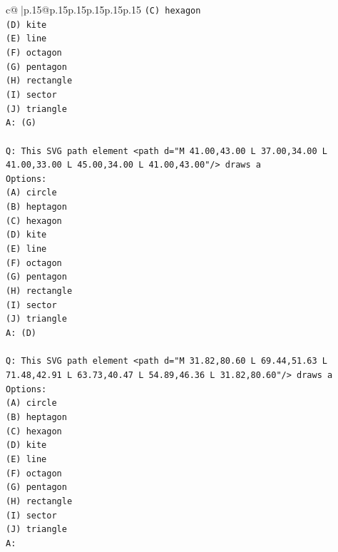 \documentclass{article}
\begin{document}
{\begin{supertabular}{c@{$\;$}|p{.15\linewidth}@{}p{.15\linewidth}p{.15\linewidth}p{.15\linewidth}p{.15\linewidth}p{.15\linewidth}}
{{{\texttt{(C) hexagon} \\
\texttt{(D) kite} \\
\texttt{(E) line} \\
\texttt{(F) octagon} \\
\texttt{(G) pentagon} \\
\texttt{(H) rectangle} \\
\texttt{(I) sector} \\
\texttt{(J) triangle} \\
\texttt{A: (G)} \\
\\ 
\texttt{Q: This SVG path element <path d="M 41.00,43.00 L 37.00,34.00 L 41.00,33.00 L 45.00,34.00 L 41.00,43.00"/> draws a} \\
\texttt{Options:} \\
\texttt{(A) circle} \\
\texttt{(B) heptagon} \\
\texttt{(C) hexagon} \\
\texttt{(D) kite} \\
\texttt{(E) line} \\
\texttt{(F) octagon} \\
\texttt{(G) pentagon} \\
\texttt{(H) rectangle} \\
\texttt{(I) sector} \\
\texttt{(J) triangle} \\
\texttt{A: (D)} \\
\\ 
\texttt{Q: This SVG path element <path d="M 31.82,80.60 L 69.44,51.63 L 71.48,42.91 L 63.73,40.47 L 54.89,46.36 L 31.82,80.60"/> draws a} \\
\texttt{Options:} \\
\texttt{(A) circle} \\
\texttt{(B) heptagon} \\
\texttt{(C) hexagon} \\
\texttt{(D) kite} \\
\texttt{(E) line} \\
\texttt{(F) octagon} \\
\texttt{(G) pentagon} \\
\texttt{(H) rectangle} \\
\texttt{(I) sector} \\
\texttt{(J) triangle} \\
\texttt{A:} \\
            }
        }
    }
     \\ \\


\end{supertabular}}
\end{document}
